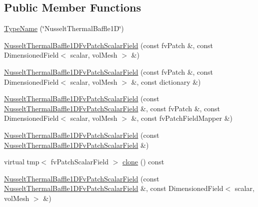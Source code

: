 \subsection*{Public Member Functions}
\begin{DoxyCompactItemize}
\item 
\hyperlink{classFoam_1_1compressible_1_1NusseltThermalBaffle1DFvPatchScalarField_ab7d2d37c49d08e9983aab01212642195}{Type\+Name} (\char`\"{}Nusselt\+Thermal\+Baffle1D\char`\"{})
\item 
\hyperlink{classFoam_1_1compressible_1_1NusseltThermalBaffle1DFvPatchScalarField_a931c11847a4cceb91f8dcb438305e83d}{Nusselt\+Thermal\+Baffle1\+D\+Fv\+Patch\+Scalar\+Field} (const fv\+Patch \&, const Dimensioned\+Field$<$ scalar, vol\+Mesh $>$ \&)
\item 
\hyperlink{classFoam_1_1compressible_1_1NusseltThermalBaffle1DFvPatchScalarField_a6745519f7eeb4338970b1387b2c9c6f2}{Nusselt\+Thermal\+Baffle1\+D\+Fv\+Patch\+Scalar\+Field} (const fv\+Patch \&, const Dimensioned\+Field$<$ scalar, vol\+Mesh $>$ \&, const dictionary \&)
\item 
\hyperlink{classFoam_1_1compressible_1_1NusseltThermalBaffle1DFvPatchScalarField_a7d6c956e93880b654ca39353a04772e1}{Nusselt\+Thermal\+Baffle1\+D\+Fv\+Patch\+Scalar\+Field} (const \hyperlink{classFoam_1_1compressible_1_1NusseltThermalBaffle1DFvPatchScalarField}{Nusselt\+Thermal\+Baffle1\+D\+Fv\+Patch\+Scalar\+Field} \&, const fv\+Patch \&, const Dimensioned\+Field$<$ scalar, vol\+Mesh $>$ \&, const fv\+Patch\+Field\+Mapper \&)
\item 
\hyperlink{classFoam_1_1compressible_1_1NusseltThermalBaffle1DFvPatchScalarField_a8bf0d85cd6952273d30379d3f8a49e61}{Nusselt\+Thermal\+Baffle1\+D\+Fv\+Patch\+Scalar\+Field} (const \hyperlink{classFoam_1_1compressible_1_1NusseltThermalBaffle1DFvPatchScalarField}{Nusselt\+Thermal\+Baffle1\+D\+Fv\+Patch\+Scalar\+Field} \&)
\item 
virtual tmp$<$ fv\+Patch\+Scalar\+Field $>$ \hyperlink{classFoam_1_1compressible_1_1NusseltThermalBaffle1DFvPatchScalarField_abeb5f251f04d334f7f18704c9227d8aa}{clone} () const
\item 
\hyperlink{classFoam_1_1compressible_1_1NusseltThermalBaffle1DFvPatchScalarField_a12cce91106bcfa7624e468263229a11d}{Nusselt\+Thermal\+Baffle1\+D\+Fv\+Patch\+Scalar\+Field} (const \hyperlink{classFoam_1_1compressible_1_1NusseltThermalBaffle1DFvPatchScalarField}{Nusselt\+Thermal\+Baffle1\+D\+Fv\+Patch\+Scalar\+Field} \&, const Dimensioned\+Field$<$ scalar, vol\+Mesh $>$ \&)
\item 

\end{DoxyCompactItemize}
